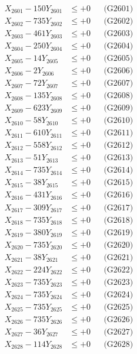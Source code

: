 \documentclass[a4paper,10pt]{article}
\begin{document}
{\begin{align}
\allowbreak
X_{2601} - 150Y_{2601} &\leq +0 && \text{(G2601)} \\
X_{2602} - 735Y_{2602} &\leq +0 && \text{(G2602)} \\
X_{2603} - 461Y_{2603} &\leq +0 && \text{(G2603)} \\
X_{2604} - 250Y_{2604} &\leq +0 && \text{(G2604)} \\
X_{2605} - 14Y_{2605} &\leq +0 && \text{(G2605)} \\
X_{2606} - 2Y_{2606} &\leq +0 && \text{(G2606)} \\
X_{2607} - 72Y_{2607} &\leq +0 && \text{(G2607)} \\
X_{2608} - 135Y_{2608} &\leq +0 && \text{(G2608)} \\
X_{2609} - 623Y_{2609} &\leq +0 && \text{(G2609)} \\
X_{2610} - 58Y_{2610} &\leq +0 && \text{(G2610)} \\
\allowbreak
X_{2611} - 610Y_{2611} &\leq +0 && \text{(G2611)} \\
X_{2612} - 558Y_{2612} &\leq +0 && \text{(G2612)} \\
X_{2613} - 51Y_{2613} &\leq +0 && \text{(G2613)} \\
X_{2614} - 735Y_{2614} &\leq +0 && \text{(G2614)} \\
X_{2615} - 38Y_{2615} &\leq +0 && \text{(G2615)} \\
X_{2616} - 431Y_{2616} &\leq +0 && \text{(G2616)} \\
X_{2617} - 309Y_{2617} &\leq +0 && \text{(G2617)} \\
X_{2618} - 735Y_{2618} &\leq +0 && \text{(G2618)} \\
X_{2619} - 380Y_{2619} &\leq +0 && \text{(G2619)} \\
X_{2620} - 735Y_{2620} &\leq +0 && \text{(G2620)} \\
\allowbreak
X_{2621} - 38Y_{2621} &\leq +0 && \text{(G2621)} \\
X_{2622} - 224Y_{2622} &\leq +0 && \text{(G2622)} \\
X_{2623} - 735Y_{2623} &\leq +0 && \text{(G2623)} \\
X_{2624} - 735Y_{2624} &\leq +0 && \text{(G2624)} \\
X_{2625} - 735Y_{2625} &\leq +0 && \text{(G2625)} \\
X_{2626} - 735Y_{2626} &\leq +0 && \text{(G2626)} \\
X_{2627} - 36Y_{2627} &\leq +0 && \text{(G2627)} \\
X_{2628} - 114Y_{2628} &\leq +0 && \text{(G2628)} \\

\end{align}}
\end{document}
